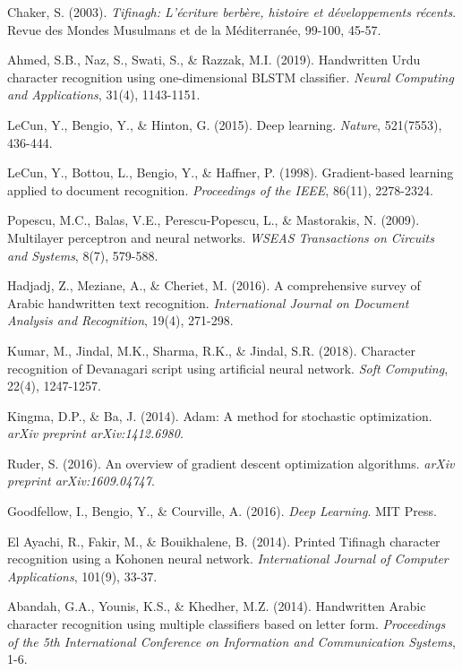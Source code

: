 \documentclass[12pt,a4paper]{article}
\begin{document}
	
	\begin{thebibliography}{20}
		
		Chaker, S. (2003). \textit{Tifinagh: L'écriture berbère, histoire et développements récents}. Revue des Mondes Musulmans et de la Méditerranée, 99-100, 45-57.
		
		Ahmed, S.B., Naz, S., Swati, S., \& Razzak, M.I. (2019). Handwritten Urdu character recognition using one-dimensional BLSTM classifier. \textit{Neural Computing and Applications}, 31(4), 1143-1151.
		
		LeCun, Y., Bengio, Y., \& Hinton, G. (2015). Deep learning. \textit{Nature}, 521(7553), 436-444.
		
		LeCun, Y., Bottou, L., Bengio, Y., \& Haffner, P. (1998). Gradient-based learning applied to document recognition. \textit{Proceedings of the IEEE}, 86(11), 2278-2324.
		
		Popescu, M.C., Balas, V.E., Perescu-Popescu, L., \& Mastorakis, N. (2009). Multilayer perceptron and neural networks. \textit{WSEAS Transactions on Circuits and Systems}, 8(7), 579-588.
		
		Hadjadj, Z., Meziane, A., \& Cheriet, M. (2016). A comprehensive survey of Arabic handwritten text recognition. \textit{International Journal on Document Analysis and Recognition}, 19(4), 271-298.
		
		Kumar, M., Jindal, M.K., Sharma, R.K., \& Jindal, S.R. (2018). Character recognition of Devanagari script using artificial neural network. \textit{Soft Computing}, 22(4), 1247-1257.
		
		Kingma, D.P., \& Ba, J. (2014). Adam: A method for stochastic optimization. \textit{arXiv preprint arXiv:1412.6980}.
		
		Ruder, S. (2016). An overview of gradient descent optimization algorithms. \textit{arXiv preprint arXiv:1609.04747}.
		
		Goodfellow, I., Bengio, Y., \& Courville, A. (2016). \textit{Deep Learning}. MIT Press.
		
		El Ayachi, R., Fakir, M., \& Bouikhalene, B. (2014). Printed Tifinagh character recognition using a Kohonen neural network. \textit{International Journal of Computer Applications}, 101(9), 33-37.
		
		Abandah, G.A., Younis, K.S., \& Khedher, M.Z. (2014). Handwritten Arabic character recognition using multiple classifiers based on letter form. \textit{Proceedings of the 5th International Conference on Information and Communication Systems}, 1-6.
		
	\end{thebibliography}
	
\end{document}
